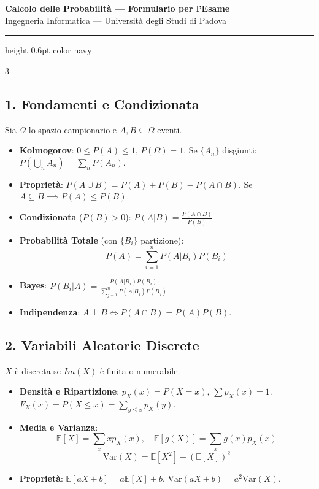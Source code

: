 \documentclass[9pt,a4paper]{article}
\begin{document}
\begin{center}
    {\fontsize{12}{14}\selectfont\bfseries\color{navy} Calcolo delle Probabilità --- Formulario per l'Esame} \\
    \vspace{1pt}
    {\fontsize{8}{9}\selectfont Ingegneria Informatica --- Università degli Studi di Padova}
\end{center}

\vspace{-6pt}
\hrule height 0.6pt color navy
\vspace{4pt}

\begin{multicols*}{3}

{\color{navy}\subsection*{1. Fondamenti e Condizionata}}
Sia $\Omega$ lo spazio campionario e $A, B \subseteq \Omega$ eventi.
\begin{itemize}
    \item \textbf{Kolmogorov}: $0 \le P(A) \le 1$, $P(\Omega) = 1$. Se $\{A_n\}$ disgiunti: $P(\bigcup_n A_n) = \sum_n P(A_n)$.
    \item \textbf{Proprietà}: $P(A \cup B) = P(A) + P(B) - P(A \cap B)$. Se $A \subseteq B \implies P(A) \le P(B)$.
    \item \textbf{Condizionata} ($P(B) > 0$): $P(A|B) = \frac{P(A \cap B)}{P(B)}$
    \item \textbf{Probabilità Totale} (con $\{B_i\}$ partizione):
    \[ P(A) = \sum_{i=1}^{n} P(A|B_i)P(B_i) \]
    \item \textbf{Bayes}: $P(B_i|A) = \frac{P(A|B_i)P(B_i)}{\sum_{j=1}^n P(A|B_j)P(B_j)}$
    \item \textbf{Indipendenza}: $A \perp B \iff P(A \cap B) = P(A)P(B)$.
\end{itemize}

{\color{navy}\subsection*{2. Variabili Aleatorie Discrete}}
$X$ è discreta se $Im(X)$ è finita o numerabile.
\begin{itemize}
    \item \textbf{Densità e Ripartizione}: $p_X(x) = P(X = x)$, $\sum p_X(x) = 1$. $F_X(x) = P(X \le x) = \sum_{y \le x} p_X(y)$.
    \item \textbf{Media e Varianza}:
    \[ \mathbb{E}[X] = \sum_{x} x p_X(x), \quad \mathbb{E}[g(X)] = \sum_{x} g(x) p_X(x) \]
    \[ \text{Var}(X) = \mathbb{E}[X^2] - (\mathbb{E}[X])^2 \]
    \item \textbf{Proprietà}: $\mathbb{E}[aX+b] = a\mathbb{E}[X]+b$, $\text{Var}(aX+b) = a^2\text{Var}(X)$.
\end{itemize}


\end{multicols*}
\end{document}
